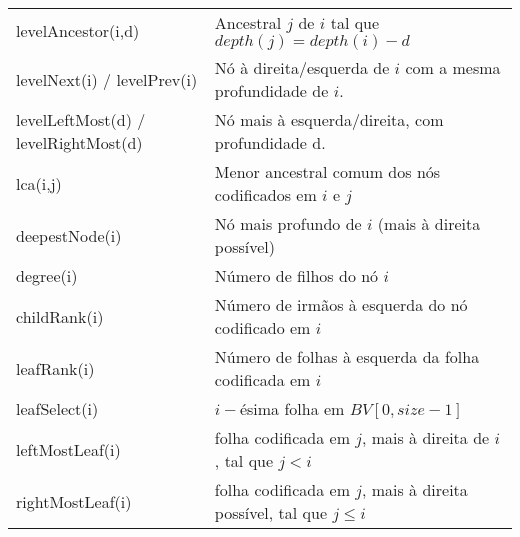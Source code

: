\begin{table}[h!]
{\begin{tabular}{ll}
    levelAncestor(i,d) & Ancestral $j$ de $i$ tal que $depth(j) = depth(i) - d$\\
    levelNext(i) / levelPrev(i) & Nó à direita/esquerda de $i$ com a mesma profundidade de $i$.\\
    levelLeftMost(d) / levelRightMost(d) &Nó mais à esquerda/direita, com profundidade d.\\
    lca(i,j)&Menor ancestral comum dos nós codificados em $i$ e $j$\\
    deepestNode(i)&Nó mais profundo de $i$ (mais à direita possível)\\
    degree(i)&Número de filhos do nó $i$ \\
    childRank(i)&Número de irmãos à esquerda do nó codificado em $i$\\
    leafRank(i)& Número de folhas à esquerda da folha codificada em $i$ \\
    leafSelect(i)& $i-$ésima folha em $BV[0,size-1]$ \\
    leftMostLeaf(i)& folha codificada em $j$, mais à direita de $i$, tal que $j<i$\\
    rightMostLeaf(i)& folha codificada em $j$, mais à direita possível, tal que $j \leq i$\\
	\bottomrule
	\end{tabular}
	}
\end{table}